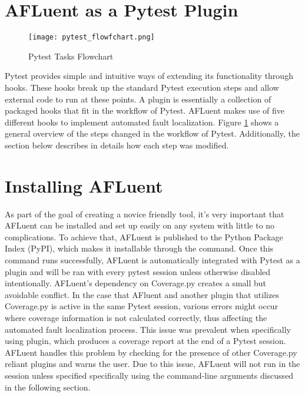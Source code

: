 \section{AFLuent as a Pytest Plugin}
\label{sec:makingPytestPlugin}

\begin{figure}[!htb]
	\begin{center}
		\texttt{[image: pytest\_flowfchart.png]}
		\caption{\label{fig:pytest_flow} Pytest Tasks Flowchart}
	\end{center}
\end{figure}

Pytest provides simple and intuitive ways of extending its functionality through
hooks. These hooks break up the standard Pytest execution steps and allow
external code to run at these points. A plugin is essentially a collection of
packaged hooks that fit in the workflow of Pytest. AFLuent makes use of five
different hooks to implement automated fault localization.
Figure \ref{fig:pytest_flow} shows a general overview of the steps changed in the
workflow of Pytest. Additionally, the section below describes in details how each
step was modified.

\section{Installing AFLuent}
\label{subsec:afluent_install}

As part of the goal of creating a novice friendly tool, it's very important that
AFLuent can be installed and set up easily on any system with little to no
complications. To achieve that, AFLuent is published to the Python Package Index
(PyPI), which makes it installable through the 
command. Once this command runs successfully, AFLuent is automatically
integrated with Pytest as a plugin and will be ran with every pytest session
unless otherwise disabled intentionally. AFLuent's dependency on Coverage.py
creates a small but avoidable conflict. In the case that AFluent and another plugin that
utilizes Coverage.py is active in the same Pytest session, various errors might
occur where coverage information is not calculated correctly, thus affecting the
automated fault localization process. This issue was prevalent when specifically
using  plugin, which produces a coverage report at the end of a
Pytest session. AFLuent handles this problem by checking for the presence of
other Coverage.py reliant plugins and warns the user. Due to this issue,
AFLuent will not run in the session unless specified specifically using the
command-line arguments discussed in the following section.

